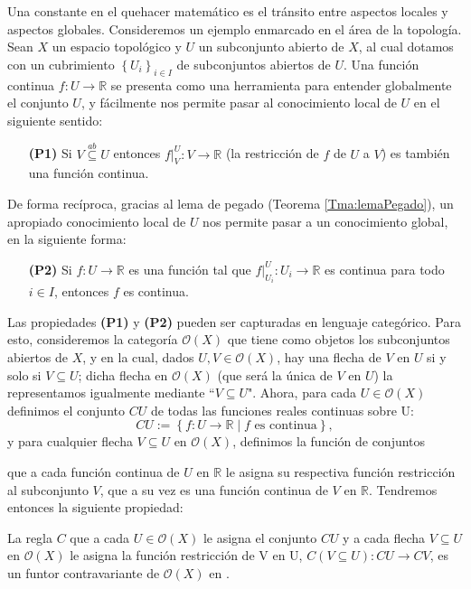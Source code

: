 Una constante en el quehacer matemático es el tránsito entre aspectos locales y aspectos globales. Consideremos un ejemplo enmarcado en el área de la topología. Sean $X$ un espacio topológico y $U$ un subconjunto abierto de $X$, al cual dotamos con un cubrimiento $\left\lbrace U_i\right\rbrace_{i\in I}$ de subconjuntos abiertos de $U$. Una función continua $f:U\to \mathbb{R}$ se presenta como una herramienta para entender globalmente el conjunto $U$, y fácilmente nos permite pasar al conocimiento local de $U$ en el siguiente sentido:
\begin{itemize}
   \item[\textbf{(P1)}] Si $V\stackrel{ab}\subseteq U$ entonces $f|^U_V:V\to\mathbb{R}$ (la restricción de $f$ de $U$ a $V$) es también una función continua. 
\end{itemize}
De forma recíproca, gracias al lema de pegado (Teorema \ref{Tma:lemaPegado}), un apropiado conocimiento local de $U$ nos permite pasar a un conocimiento global, en la siguiente forma:
\begin{itemize}
   \item[\textbf{(P2)}] Si $f:U\to \mathbb{R}$ es una función tal que $f|^{U}_{U_i}:U_i\to\mathbb{R}$ es continua para todo $i\in I$, entonces $f$ es continua.
\end{itemize}
Las propiedades \textbf{(P1)} y \textbf{(P2)} pueden ser capturadas en lenguaje categórico. Para esto, consideremos la categoría $\mathcal{O}(X)$ que tiene como objetos los subconjuntos abiertos de $X$, y en la cual, dados $U,V\in \mathcal{O}(X)$, hay una flecha de $V$ en $U$ si y solo si $V\subseteq U$; dicha flecha en $\mathcal{O}(X)$ (que será la única de $V$ en $U$) la representamos igualmente mediante ``$V\subseteq U$". Ahora, para cada $U\in\mathcal{O}(X)$ definimos el conjunto $CU$ de todas las funciones reales continuas sobre U:
$$
CU:=\left\lbrace f:U\to\mathbb{R}\mid f \text{ es continua}\right\rbrace,
$$
y para cualquier flecha $V\subseteq U$ en $\mathcal{O}(X)$, definimos la función de conjuntos

que a cada función continua de $U$ en $\mathbb{R}$ le asigna su respectiva función restricción al subconjunto $V$, que a su vez es una función continua de $V$ en $\mathbb{R}$. Tendremos entonces la siguiente propiedad:
\begin{Prop}\label{Prop:P1}
   La regla $C$ que a cada $U\in\mathcal{O}(X)$ le asigna el conjunto $CU$ y a cada flecha $V\subseteq U$ en $\mathcal{O}(X)$ le asigna la función restricción de V en U, $C(V\subseteq U): CU\to CV$, es un funtor contravariante de $\mathcal{O}(X)$ en .
\end{Prop}
